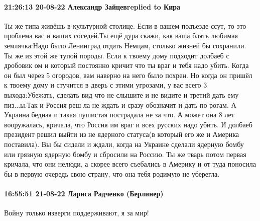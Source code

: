  
 
 
 
 

\paragraph{21:26:13 20-08-22 Александр Зайцевreplied to Кира}

Ты же типа живёшь в культурной столице. Если в вашем подъезде ссут, то это
проблема вас и ваших соседей.Ты ещё дура скажи, как ваша блять любимая
землячка:Надо было Ленинград отдать Немцам, столько жизней бы сохранили. Ты же
из этой же тупой породы. Если к твоему дому подходит долбаеб с дробовик ом и
который постоянно кричит что ты враг и тебя надо убить. Когда он был через 5
огородов, вам наверно на него было похрен. Но когда он пришёл к твоему дому и
стучится в дверь с этими угрозами, у вас всего 3 выхода:Убежать, сделать вид
что не слышите и не видите и третий дать ему пиз...ы.Так и Россия реш ла не
ждать и сразу обозначит и дать по рогам. А Украина бедная и такая пушистая
пострадала не за что. А может она 8 лет вооружалась, кричала, что Россия им
враг и всех русских надо убить. И долбаеб президент решил выйти из не ядерного
статуса(в который его же и Америка поставила). Вы бы сидели и ждали, когда на
Украине сделали ядерную бомбу или грязную ядерную бомбу и сбросили на Россию.
Ты же тварь потом первая кричала, что они нелюди, а скорее всего съебались в
Америку и от туда поносила бы в первую очередь свою страну, что она тебя
родимую не уберегла.

\paragraph{16:55:51 21-08-22 Лариса Радченко (Берлинер)}

Войну только изверги поддерживают, я за мир!
